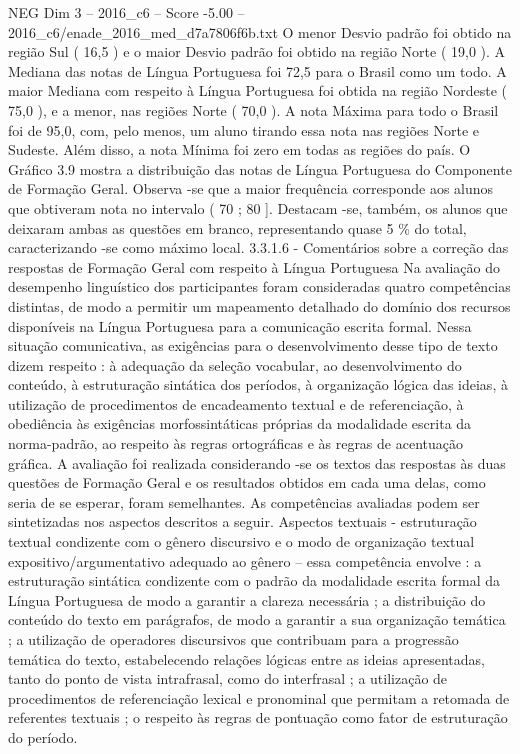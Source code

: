 \begin{textsample}{NEG Dim 3 – 2016\_c6 – Score -5.00 – 2016\_c6/enade\_2016\_med\_d7a7806f6b.txt}
O menor Desvio padrão foi obtido na região Sul ( 16,5 ) e o maior Desvio padrão foi obtido na região Norte ( 19,0 ).
A Mediana das notas de Língua Portuguesa foi 72,5 para o Brasil como um todo.
A maior Mediana com respeito à Língua Portuguesa foi obtida na região Nordeste ( 75,0 ), e a menor, nas regiões Norte ( 70,0 ).
A nota Máxima para todo o Brasil foi de 95,0, com, pelo menos, um aluno tirando essa nota nas regiões Norte e Sudeste.
Além disso, a nota Mínima foi zero em todas as regiões do país.
O Gráfico 3.9 mostra a distribuição das notas de Língua Portuguesa do Componente de Formação Geral.
Observa -se que a maior frequência corresponde aos alunos que obtiveram nota no intervalo ( 70 ; 80 ].
Destacam -se, também, os alunos que deixaram ambas as questões em branco, representando quase 5 \% do total, caracterizando -se como máximo local. 3.3.1.6 - Comentários sobre a correção das respostas de Formação Geral com respeito à Língua Portuguesa Na avaliação do desempenho linguístico dos participantes foram consideradas quatro competências distintas, de modo a permitir um mapeamento detalhado do domínio dos recursos disponíveis na Língua Portuguesa para a comunicação escrita formal.
Nessa situação comunicativa, as exigências para o desenvolvimento desse tipo de texto dizem respeito : à adequação da seleção vocabular, ao desenvolvimento do conteúdo, à estruturação sintática dos períodos, à organização lógica das ideias, à utilização de procedimentos de encadeamento textual e de referenciação, à obediência às exigências morfossintáticas próprias da modalidade escrita da norma-padrão, ao respeito às regras ortográficas e às regras de acentuação gráfica.
A avaliação foi realizada considerando -se os textos das respostas às duas questões de Formação Geral e os resultados obtidos em cada uma delas, como seria de se esperar, foram semelhantes.
As competências avaliadas podem ser sintetizadas nos aspectos descritos a seguir.
Aspectos textuais - estruturação textual condizente com o gênero discursivo e o modo de organização textual expositivo/argumentativo adequado ao gênero – essa competência envolve : a estruturação sintática condizente com o padrão da modalidade escrita formal da Língua Portuguesa de modo a garantir a clareza necessária ; a distribuição do conteúdo do texto em parágrafos, de modo a garantir a sua organização temática ; a utilização de operadores discursivos que contribuam para a progressão temática do texto, estabelecendo relações lógicas entre as ideias apresentadas, tanto do ponto de vista intrafrasal, como do interfrasal ; a utilização de procedimentos de referenciação lexical e pronominal que permitam a retomada de referentes textuais ; o respeito às regras de pontuação como fator de estruturação do período.

\end{textsample}
